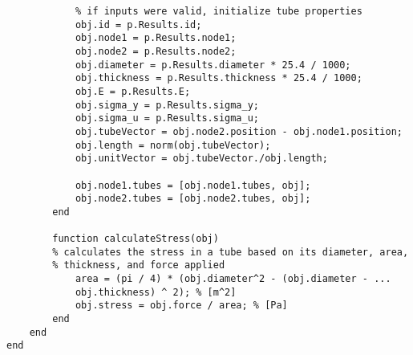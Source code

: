 \begin{lstlisting}
			% if inputs were valid, initialize tube properties
			obj.id = p.Results.id;
			obj.node1 = p.Results.node1;
			obj.node2 = p.Results.node2;
			obj.diameter = p.Results.diameter * 25.4 / 1000;
			obj.thickness = p.Results.thickness * 25.4 / 1000;
			obj.E = p.Results.E;
			obj.sigma_y = p.Results.sigma_y;
			obj.sigma_u = p.Results.sigma_u;
			obj.tubeVector = obj.node2.position - obj.node1.position;
			obj.length = norm(obj.tubeVector);
			obj.unitVector = obj.tubeVector./obj.length;
			
			obj.node1.tubes = [obj.node1.tubes, obj];
			obj.node2.tubes = [obj.node2.tubes, obj];
		end
		
		function calculateStress(obj)
		% calculates the stress in a tube based on its diameter, area,
		% thickness, and force applied
			area = (pi / 4) * (obj.diameter^2 - (obj.diameter - ...
			obj.thickness) ^ 2); % [m^2]
			obj.stress = obj.force / area; % [Pa]
		end
	end
end

\end{lstlisting}
